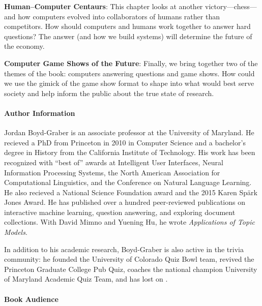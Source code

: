 \begin{enumerate}
\begin{enumerate*}
        \item {\bf Human--Computer Centaurs}: This chapter looks at
        another  victory---chess---and how computers evolved into
        collaborators of humans rather than competitors.  How should computers
        and humans work together to answer hard questions?  The answer (and
        how we build  systems) will determine the future of the
        economy.

        \item {\bf Computer Game Shows of the Future}: Finally, we bring
        together two of the themes of the book: computers answering questions
        and game shows.  How could we use the gimick of the game show format
        to shape  into what would best serve society and help inform the
        public about the true state of  research.

        \end{enumerate*}

\end{enumerate}

\paragraph{Author Information}

Jordan Boyd-Graber is an associate professor at the University of Maryland.
He recieved a PhD from Princeton in 2010 in Computer Science and a bachelor's
degree in History from the California Institute of Technology.
%
His work has been recognized with ``best of'' awards at Intelligent User
Interfaces, Neural Information Processing Systems, the North American
Association for Computational Linguistics, and the Conference on Natural
Language Learning.
%
He also recieved a National Science Foundation  award and the 2015
Karen Sp\"ark Jones Award.
%
He has published over a hundred peer-reviewed publications on interactive
machine learning, question answering, and exploring document collections.
%
With David Mimno and Yuening Hu, he wrote \emph{Applications of Topic Models}.

In addition to his academic research, Boyd-Graber is also active in the trivia
community: he founded the University of Colorado Quiz Bowl team, revived the
Princeton Graduate College Pub Quiz, coaches the national champion University
of Maryland Academic Quiz Team, and has lost on \jeopardyp{}.

\paragraph{Book Audience}


